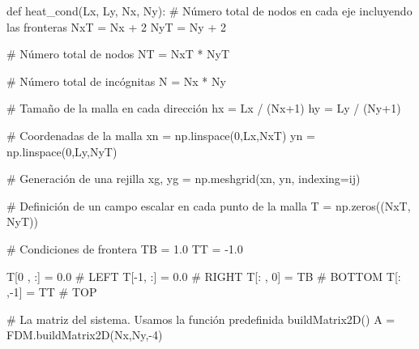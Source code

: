 \documentclass[
  letterpaper,
  DIV=11,
  numbers=noendperiod]{scrreprt}
\newenvironment{Shaded}{\begin{snugshade}}{\end{snugshade}}
\newcommand{\CommentTok}[1]{\textcolor[rgb]{0.37,0.37,0.37}{#1}}
\newcommand{\DecValTok}[1]{\textcolor[rgb]{0.68,0.00,0.00}{#1}}
\newcommand{\FloatTok}[1]{\textcolor[rgb]{0.68,0.00,0.00}{#1}}
\newcommand{\KeywordTok}[1]{\textcolor[rgb]{0.00,0.23,0.31}{#1}}
\newcommand{\NormalTok}[1]{\textcolor[rgb]{0.00,0.23,0.31}{#1}}
\newcommand{\OperatorTok}[1]{\textcolor[rgb]{0.37,0.37,0.37}{#1}}
\newcommand{\StringTok}[1]{\textcolor[rgb]{0.13,0.47,0.30}{#1}}
\begin{document}
\begin{Shaded}
\begin{Highlighting}[]
\KeywordTok{def}\NormalTok{ heat\_cond(Lx, Ly, Nx, Ny):}
    \CommentTok{\# Número total de nodos en cada eje incluyendo las fronteras}
\NormalTok{    NxT }\OperatorTok{=}\NormalTok{ Nx }\OperatorTok{+} \DecValTok{2}
\NormalTok{    NyT }\OperatorTok{=}\NormalTok{ Ny }\OperatorTok{+} \DecValTok{2}
    
    \CommentTok{\# Número total de nodos}
\NormalTok{    NT }\OperatorTok{=}\NormalTok{ NxT }\OperatorTok{*}\NormalTok{ NyT}
    
    \CommentTok{\# Número total de incógnitas}
\NormalTok{    N }\OperatorTok{=}\NormalTok{ Nx }\OperatorTok{*}\NormalTok{ Ny}
    
    \CommentTok{\# Tamaño de la malla en cada dirección}
\NormalTok{    hx }\OperatorTok{=}\NormalTok{ Lx }\OperatorTok{/}\NormalTok{ (Nx}\OperatorTok{+}\DecValTok{1}\NormalTok{)}
\NormalTok{    hy }\OperatorTok{=}\NormalTok{ Ly }\OperatorTok{/}\NormalTok{ (Ny}\OperatorTok{+}\DecValTok{1}\NormalTok{)}
    
    \CommentTok{\# Coordenadas de la malla}
\NormalTok{    xn }\OperatorTok{=}\NormalTok{ np.linspace(}\DecValTok{0}\NormalTok{,Lx,NxT)}
\NormalTok{    yn }\OperatorTok{=}\NormalTok{ np.linspace(}\DecValTok{0}\NormalTok{,Ly,NyT)}
    
    \CommentTok{\# Generación de una rejilla}
\NormalTok{    xg, yg }\OperatorTok{=}\NormalTok{ np.meshgrid(xn, yn, indexing}\OperatorTok{=}\StringTok{\textquotesingle{}ij\textquotesingle{}}\NormalTok{)}

    \CommentTok{\# Definición de un campo escalar en cada punto de la malla}
\NormalTok{    T }\OperatorTok{=}\NormalTok{ np.zeros((NxT, NyT))}
    
    \CommentTok{\# Condiciones de frontera}
\NormalTok{    TB }\OperatorTok{=} \FloatTok{1.0}
\NormalTok{    TT }\OperatorTok{=} \OperatorTok{{-}}\FloatTok{1.0}
    
\NormalTok{    T[}\DecValTok{0}\NormalTok{ , :] }\OperatorTok{=} \FloatTok{0.0} \CommentTok{\# LEFT}
\NormalTok{    T[}\OperatorTok{{-}}\DecValTok{1}\NormalTok{, :] }\OperatorTok{=} \FloatTok{0.0} \CommentTok{\# RIGHT}
\NormalTok{    T[: , }\DecValTok{0}\NormalTok{] }\OperatorTok{=}\NormalTok{ TB  }\CommentTok{\# BOTTOM}
\NormalTok{    T[: ,}\OperatorTok{{-}}\DecValTok{1}\NormalTok{] }\OperatorTok{=}\NormalTok{ TT  }\CommentTok{\# TOP}

    \CommentTok{\# La matriz del sistema. Usamos la función predefinida buildMatrix2D()}
\NormalTok{    A }\OperatorTok{=}\NormalTok{ FDM.buildMatrix2D(Nx,Ny,}\OperatorTok{{-}}\DecValTok{4}\NormalTok{)}


\end{Highlighting}
\end{Shaded}
\end{document}
